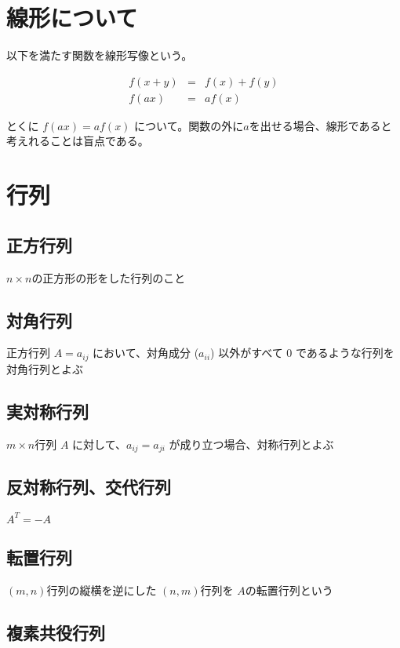 \documentclass[a4j, uplatex]{jsarticle}
\begin{document}
\section{線形について}

以下を満たす関数を線形写像という。

\begin{eqnarray}
    f(x+y) &=& f(x) + f(y) \\
    f(ax) &=& af(x)
\end{eqnarray}


とくに $f(ax)=af(x)$ について。関数の外に$a$を出せる場合、線形であると考えれることは盲点である。

\section{行列}

\subsection{正方行列}

$n\times n$の正方形の形をした行列のこと

\subsection{対角行列}

正方行列 $A = a_{ij}$ において、対角成分 ($a_{ii}$) 以外がすべて 0 であるような行列を対角行列とよぶ


\subsection{実対称行列}

$m \times n $行列 $A$ に対して、$a_{ij} = a_{ji}$ が成り立つ場合、対称行列とよぶ


\subsection{反対称行列、交代行列}

$A^T = -A$


\subsection{転置行列}

$(m, n)$行列の縦横を逆にした $(n,m)$行列を $A$の転置行列という


\subsection{複素共役行列}
\end{document}
